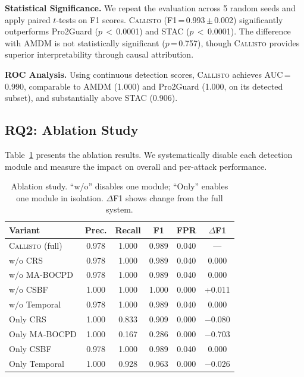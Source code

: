 \documentclass[conference,compsoc]{IEEEtran}
\newcommand{\system}{\textsc{Callisto}}
\begin{document}
\textbf{Statistical Significance.} We repeat the evaluation across 5 random seeds and apply paired $t$-tests on F1 scores. \system{} (F1\,=\,0.993\,$\pm$\,0.002) significantly outperforms Pro2Guard ($p$\,$<$\,0.0001) and STAC ($p$\,$<$\,0.0001). The difference with AMDM is not statistically significant ($p$\,=\,0.757), though \system{} provides superior interpretability through causal attribution.

\textbf{ROC Analysis.} Using continuous detection scores, \system{} achieves AUC\,=\,0.990, comparable to AMDM (1.000) and Pro2Guard (1.000, on its detected subset), and substantially above STAC (0.906).

\subsection{RQ2: Ablation Study}
\label{sec:ablation}

Table~\ref{tab:ablation} presents the ablation results. We systematically disable each detection module and measure the impact on overall and per-attack performance.

\begin{table}[t]
\centering
\caption{Ablation study. ``w/o'' disables one module; ``Only'' enables one module in isolation. $\Delta$F1 shows change from the full system.}
\label{tab:ablation}
\small
\begin{tabular}{@{}lccccc@{}}
\toprule
Variant & Prec. & Recall & F1 & FPR & $\Delta$F1 \\
\midrule
\system{} (full) & 0.978 & 1.000 & 0.989 & 0.040 & --- \\
\midrule
w/o CRS & 0.978 & 1.000 & 0.989 & 0.040 & 0.000 \\
w/o MA-BOCPD & 0.978 & 1.000 & 0.989 & 0.040 & 0.000 \\
w/o CSBF & 1.000 & 1.000 & 1.000 & 0.000 & +0.011 \\
w/o Temporal & 0.978 & 1.000 & 0.989 & 0.040 & 0.000 \\
\midrule
Only CRS & 1.000 & 0.833 & 0.909 & 0.000 & $-$0.080 \\
Only MA-BOCPD & 1.000 & 0.167 & 0.286 & 0.000 & $-$0.703 \\
Only CSBF & 0.978 & 1.000 & 0.989 & 0.040 & 0.000 \\
Only Temporal & 1.000 & 0.928 & 0.963 & 0.000 & $-$0.026 \\
\bottomrule
\end{tabular}
\end{table}
\end{document}
